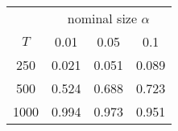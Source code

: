 % 
\begin{tabular}{cccc}
  \hline
  & \multicolumn{3}{c}{nominal size $\alpha$} \\
 $T$ & 0.01 & 0.05 & 0.1 \\
 \hline
250 & 0.021 & 0.051 & 0.089 \\ 
  500 & 0.524 & 0.688 & 0.723 \\ 
  1000 & 0.994 & 0.973 & 0.951 \\ 
   \hline
\end{tabular}

